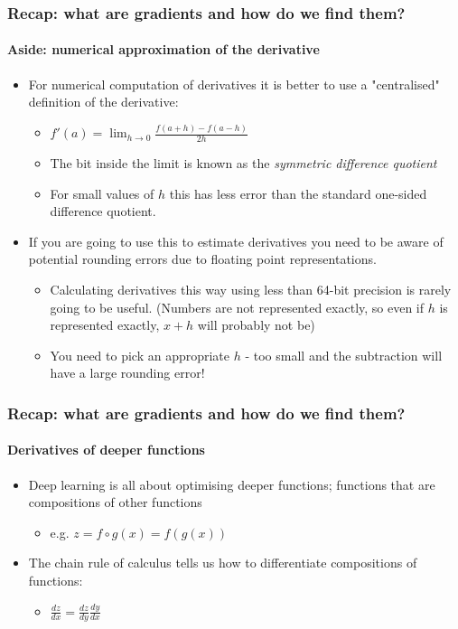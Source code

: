 \documentclass{beamer}
\begin{document}
\begin{frame}
\frametitle{Recap: what are gradients and how do we find them?}
\framesubtitle{Aside: numerical approximation of the derivative}

\begin{itemize}
\item For numerical computation of derivatives it is better to use a "centralised" definition of the derivative:
\begin{itemize}
	\item<+-> $f'(a) = \lim_{h\to0} \frac{f(a+h) - f(a-h)}{2h}$
	\item<+-> The bit inside the limit is known as the \emph{symmetric difference quotient}
	\item<+-> For small values of $h$ this has less error than the standard one-sided difference quotient.
\end{itemize}
\item<+-> If you are going to use this to estimate derivatives you need to be aware of potential rounding errors due to floating point representations.
\begin{itemize}
	\item Calculating derivatives this way using less than 64-bit precision is rarely going to be useful. (Numbers are not represented exactly, so even if $h$ is represented exactly, $x+h$ will probably not be)
	\item You need to pick an appropriate $h$ - too small and the subtraction will have a large rounding error!
\end{itemize}
\end{itemize}
\end{frame}

\begin{frame}
\frametitle{Recap: what are gradients and how do we find them?}
\framesubtitle{Derivatives of deeper functions}

\begin{itemize}
	\item<+-> Deep learning is all about optimising deeper functions; functions that are compositions of other functions
	\begin{itemize}
		\item e.g. $z = f \circ g(x) = f(g(x))$
	\end{itemize}
	\item<+-> The chain rule of calculus tells us how to differentiate compositions of functions:
	\begin{itemize}
		\item $\frac{dz}{dx}=\frac{dz}{dy}\frac{dy}{dx}$
	\end{itemize}
\end{itemize}
\end{frame}
\end{document}
